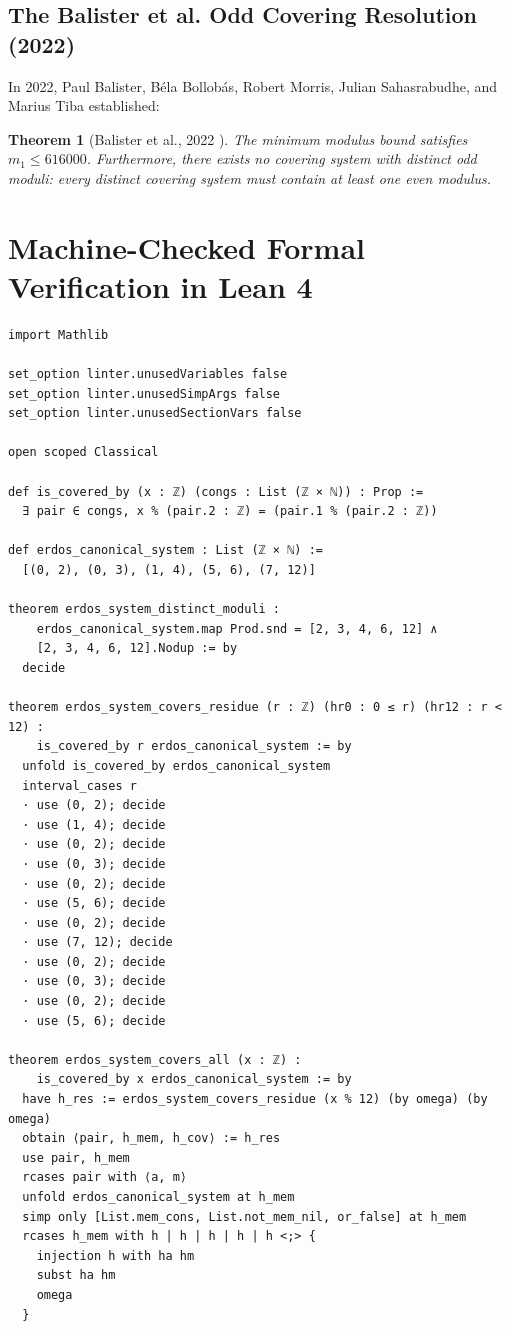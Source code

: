 \documentclass[11pt,a4paper]{article}
\newtheorem{theorem}{Theorem}[section]
\theoremstyle{definition}
\begin{document}
\subsection{The Balister et al. Odd Covering Resolution (2022)}
In 2022, Paul Balister, B\'ela Bollob\'as, Robert Morris, Julian Sahasrabudhe, and Marius Tiba \cite{balister2022} established:

\begin{theorem}[Balister et al., 2022 \cite{balister2022}]\label{thm:balister_odd}
The minimum modulus bound satisfies $m_1 \le 616000$. Furthermore, there exists no covering system with distinct odd moduli: every distinct covering system must contain at least one even modulus.
\end{theorem}

\section{Machine-Checked Formal Verification in Lean 4}

\begin{lstlisting}[caption={Formal Lean 4 Implementation of Covering Systems}]
import Mathlib

set_option linter.unusedVariables false
set_option linter.unusedSimpArgs false
set_option linter.unusedSectionVars false

open scoped Classical

def is_covered_by (x : ℤ) (congs : List (ℤ × ℕ)) : Prop :=
  ∃ pair ∈ congs, x % (pair.2 : ℤ) = (pair.1 % (pair.2 : ℤ))

def erdos_canonical_system : List (ℤ × ℕ) :=
  [(0, 2), (0, 3), (1, 4), (5, 6), (7, 12)]

theorem erdos_system_distinct_moduli :
    erdos_canonical_system.map Prod.snd = [2, 3, 4, 6, 12] ∧
    [2, 3, 4, 6, 12].Nodup := by
  decide

theorem erdos_system_covers_residue (r : ℤ) (hr0 : 0 ≤ r) (hr12 : r < 12) :
    is_covered_by r erdos_canonical_system := by
  unfold is_covered_by erdos_canonical_system
  interval_cases r
  · use (0, 2); decide
  · use (1, 4); decide
  · use (0, 2); decide
  · use (0, 3); decide
  · use (0, 2); decide
  · use (5, 6); decide
  · use (0, 2); decide
  · use (7, 12); decide
  · use (0, 2); decide
  · use (0, 3); decide
  · use (0, 2); decide
  · use (5, 6); decide

theorem erdos_system_covers_all (x : ℤ) :
    is_covered_by x erdos_canonical_system := by
  have h_res := erdos_system_covers_residue (x % 12) (by omega) (by omega)
  obtain ⟨pair, h_mem, h_cov⟩ := h_res
  use pair, h_mem
  rcases pair with ⟨a, m⟩
  unfold erdos_canonical_system at h_mem
  simp only [List.mem_cons, List.not_mem_nil, or_false] at h_mem
  rcases h_mem with h | h | h | h | h <;> {
    injection h with ha hm
    subst ha hm
    omega
  }
\end{lstlisting}
\end{document}

